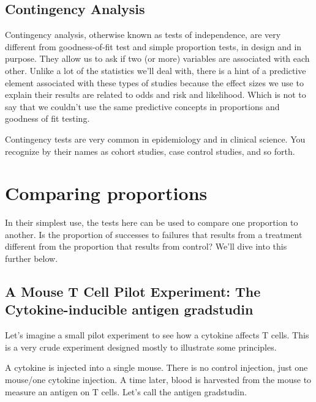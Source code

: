 \documentclass[]{book}
\begin{document}
\hypertarget{contingency-analysis}{%
\subsection{Contingency Analysis}\label{contingency-analysis}}

Contingency analysis, otherwise known as tests of independence, are very different from goodness-of-fit test and simple proportion tests, in design and in purpose. They allow us to ask if two (or more) variables are associated with each other. Unlike a lot of the statistics we'll deal with, there is a hint of a predictive element associated with these types of studies because the effect sizes we use to explain their results are related to odds and risk and likelihood. Which is not to say that we couldn't use the same predictive concepts in proportions and goodness of fit testing.

Contingency tests are very common in epidemiology and in clinical science. You recognize by their names as cohort studies, case control studies, and so forth.

\hypertarget{comparing-proportions}{%
\section{Comparing proportions}\label{comparing-proportions}}

In their simplest use, the tests here can be used to compare one proportion to another. Is the proportion of successes to failures that results from a treatment different from the proportion that results from control? We'll dive into this further below.

\hypertarget{a-mouse-t-cell-pilot-experiment-the-cytokine-inducible-antigen-gradstudin}{%
\subsection{A Mouse T Cell Pilot Experiment: The Cytokine-inducible antigen gradstudin}\label{a-mouse-t-cell-pilot-experiment-the-cytokine-inducible-antigen-gradstudin}}

Let's imagine a small pilot experiment to see how a cytokine affects T cells. This is a very crude experiment designed mostly to illustrate some principles.

A cytokine is injected into a single mouse. There is no control injection, just one mouse/one cytokine injection. A time later, blood is harvested from the mouse to measure an antigen on T cells. Let's call the antigen gradstudin.
\end{document}

